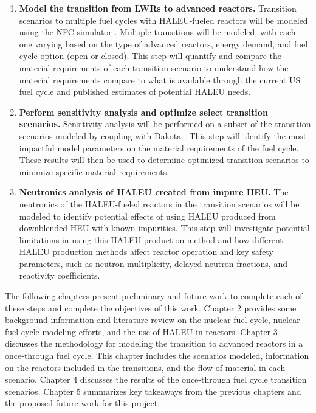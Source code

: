 \begin{enumerate}
\item \textbf{Model the transition from \glspl{LWR} to advanced reactors.} 
Transition scenarios to multiple fuel cycles with \gls{HALEU}-fueled 
reactors will 
be modeled using the \gls{NFC} simulator \Cyclus \cite{huff_fundamental_2016}. 
Multiple transitions will be modeled, with each one varying based on the type
of  
advanced reactors, energy demand, and fuel cycle option (open or closed). This 
step will quantify and compare the material requirements of each transition 
scenario to understand how the material requirements compare to what is available 
through the current US fuel cycle and published estimates of potential 
\gls{HALEU} needs. 

\item \textbf{Perform sensitivity analysis and optimize select transition scenarios.}
Sensitivity analysis will be performed on a subset of the transition scenarios
modeled by coupling \Cyclus with Dakota \cite{adams_dakota_2019}. This step 
will identify the most impactful model parameters on 
the material requirements of the fuel cycle. These results will then be 
used to determine optimized transition scenarios to minimize specific 
material requirements. 

\item \textbf{Neutronics analysis of \gls{HALEU} created from impure \gls{HEU}.}
The neutronics of the \gls{HALEU}-fueled reactors in the transition scenarios 
will be modeled to identify potential effects of using \gls{HALEU} produced 
from downblended \gls{HEU} with known impurities. This step will investigate 
potential limitations in using this \gls{HALEU} production method and 
how different \gls{HALEU} production methods affect reactor operation and 
key safety parameters, such as neutron multiplicity, delayed neutron 
fractions, and reactivity coefficients.
\end{enumerate}


The following chapters present preliminary and future work to complete 
each of these steps and complete the objectives of this work. Chapter 2 
provides some 
background information and literature review on the nuclear fuel cycle,
nuclear fuel cycle 
modeling efforts, and the use of \gls{HALEU} in reactors.
Chapter 3 discusses the methodology for modeling the transition to advanced 
reactors in a once-through fuel cycle. This chapter includes the scenarios
modeled, information on the reactors included in the transitions, and the 
flow of 
material in each scenario. Chapter 4 discusses the results of the 
once-through fuel cycle transition scenarios. Chapter 5 summarizes key 
takeaways from the previous chapters and the proposed future work for 
this project. 